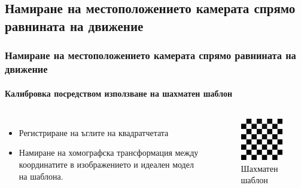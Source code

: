 \documentclass[hyperref=unicode]{beamer}
\begin{document}
    \subsection*{Намиране на местоположението камерата спрямо равнината на движение}
    \begin{frame}
      \frametitle{Намиране на местоположението камерата спрямо равнината на движение}
      \framesubtitle{Калибровка посредством използване на шахматен шаблон}
      \begin{columns}
      \begin{itemize}
        \item{Регистриране на ъглите на квадратчетата}
        \item{Намиране на хомографска трансформация между координатите в изображението и идеален модел на шаблона.}
      \end{itemize}
      \begin{figure}
        \includegraphics[width=40mm]{chessboard.jpg}
        \caption{Шахматен шаблон}
        \label{fig:chess}
      \end{figure}
      \end{columns}
    \end{frame}

\end{document}
